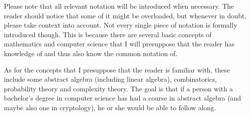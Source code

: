 Please note that all relevant notation will be introduced when necessary. The reader should notice that some of it might be overloaded, but whenever in doubt, please take context into account. Not every single piece of notation is formally introduced though. This is because there are several basic concepts of mathematics and computer science that I will presuppose that the reader has knowledge of and thus also know the common notation of.

As for the concepts that I presuppose that the reader is familiar with, these include some abstract algebra (including linear algebra), combinatorics, probability theory and complexity theory. The goal is that if a person with a bachelor's degree in computer science has had a course in abstract algebra (and maybe also one in cryptology), he or she would be able to follow along.

